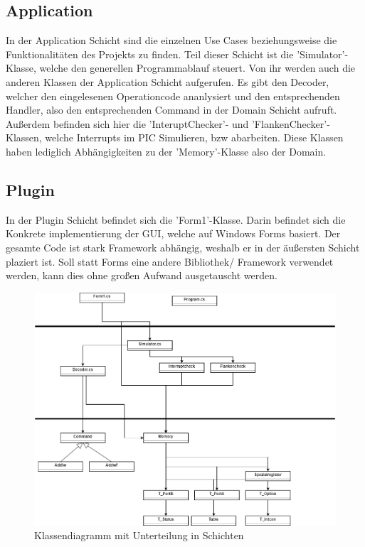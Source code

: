 \documentclass[12pt,a4paper,titlepage,ngerman,pdftex]{report}
\begin{document}
    \subsection{Application}
    In der Application Schicht sind die einzelnen Use Cases beziehungsweise die Funktionalitäten des Projekts zu finden. Teil dieser Schicht ist die 'Simulator'- Klasse, welche den generellen Programmablauf steuert. Von ihr werden auch die anderen Klassen der Application Schicht aufgerufen.
    Es gibt den Decoder, welcher den eingelesenen Operationcode ananlysiert und den entsprechenden Handler, also den entsprechenden Command in der Domain Schicht aufruft. Außerdem befinden sich hier die 'InteruptChecker'- und 'FlankenChecker'-Klassen, welche Interrupts im PIC Simulieren, bzw abarbeiten.
    Diese Klassen haben lediglich Abhängigkeiten zu der 'Memory'-Klasse also der Domain. 

    \subsection{Plugin}
    In der Plugin Schicht befindet sich die 'Form1'-Klasse. Darin befindet sich die Konkrete implementierung der GUI, welche auf Windows Forms basiert. Der gesamte Code ist stark Framework abhängig, weshalb er in der äußersten Schicht plaziert ist.
    Soll statt Forms eine andere Bibliothek/ Framework verwendet werden, kann dies ohne großen Aufwand ausgetauscht werden.
 
    \begin{figure}
        \centering
        \includegraphics[width = \linewidth]{"images/classdiagramm.png"}
        \caption{Klassendiagramm mit Unterteilung in Schichten}
    \end{figure}
\end{document}

